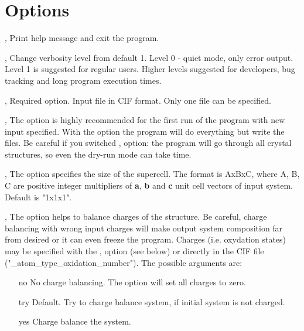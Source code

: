 \documentclass[a4paper,english]{article}
\begin{document}
\section{Options}
\begin{Description}

\item[\Opt{-h}, \Opt{\Dd help}]
      Print help message and exit the program.

\item[\OptArg{-v }{level}, \OptArg{\Dd verbose=}{level}] 
      Change verbosity level from default 1. Level 0 - quiet mode, only error output. Level 1 is suggested for regular users. Higher levels suggested for developers, bug tracking and long program execution times. 

\item[\OptArg{-i }{input-file}, \OptArg{\Dd input=}{input-file}]
      Required option. Input file in CIF format. Only one file can be specified.

\item[\Opt{-d}, \Opt{\Dd dry-run}]
      The option is highly recommended for the first run of the program with new input specified. 
      With the option the program will do everything but write the files. Be careful if you switched ,  option: the program will go through all crystal structures, so even the dry-run mode can take time.

\item[\OptArg{-s }{cell-size}, \OptArg{\Dd cell-size=}{cell-size}]
      The option specifies the size of the supercell. The format is AxBxC, where A, B, C are positive integer multipliers of \textbf{a}, \textbf{b} and \textbf{c} unit cell vectors of input system. Default is "1x1x1".

\item[\OptArg{-c }{balance-type}, \OptArg{\Dd charge-balance=}{balance-type}]
      The option helps to balance charges of the structure. Be careful, charge balancing with wrong input charges will make output system composition far from desired or it can even freeze the program. Charges (i.e. oxydation states) may be specified with the ,  option (see below) or directly in the CIF file ("\_atom\_type\_oxidation\_number"). The possible arguments are:
      \begin{itemize}
         \item[no]   No charge balancing. The option will set all charges to zero.
         \item[try]  Default. Try to charge balance system, if initial system is not charged.
         \item[yes]  Charge balance the system.
      \end{itemize}


\end{Description}
\end{document}
